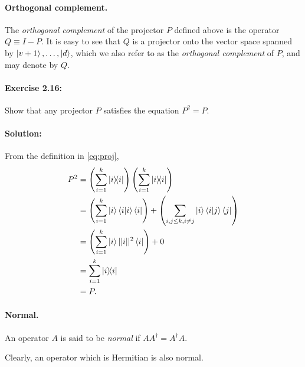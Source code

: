 \paragraph{Orthogonal complement.} The \emph{orthogonal complement} of the
projector $P$ defined above is the operator $Q \equiv I - P$. It is easy to see
that $Q$ is a projector onto the vector space spanned by $\ket{v+1}, \ldots,
\ket{d}$, which we also refer to as the \emph{orthogonal complement} of $P$,
and may denote by $Q$.

\paragraph{\cite{mikeandike} Exercise 2.16:} Show that any projector $P$
satisfies the equation $P^2 = P$.

\paragraph{Solution:} From the definition in \eqref{eq:proj}, \begin{align*}
  P^2 &= \left(\sum_{i=1}^k \ketbra{i}{i}\right) \left(\sum_{i=1}^k
      \ketbra{i}{i}\right) \\
    &= \left(\sum_{i=1}^k \ket{i}\braket{i}{i}\bra{i}\right) + \left(\sum_{i, j
      \leq k, i \neq j} \ket{i}\braket{i}{j}\bra{j}\right) \\
    &= \left(\sum_{i=1}^k \ket{i} ||i||^2 \bra{i}\right) + 0 \\
    &= \sum_{i=1}^k \ketbra{i}{i} \\
    &= P.
\end{align*}

\paragraph{Normal.} An operator $A$ is said to be \emph{normal} if $A A^\dagger
= A^\dagger A$.

Clearly, an operator which is Hermitian is also normal.

